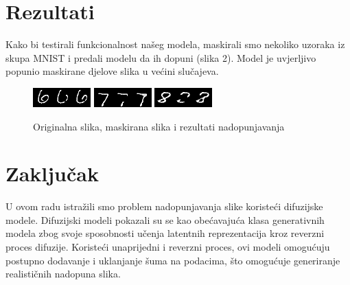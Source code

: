 \documentclass[10pt, a4paper, croatian]{article}
\begin{document}
\section{Rezultati}
Kako bi testirali funkcionalnost našeg modela, maskirali smo nekoliko uzoraka iz skupa MNIST i predali modelu da ih dopuni (slika 2).
Model je uvjerljivo popunio maskirane djelove slika u većini slučajeva.
\begin{figure}
	\begin{center}
	\includegraphics[width=\columnwidth]{../repaint_output/inpainted_combined_6.png}
	\includegraphics[width=\columnwidth]{../repaint_output/inpainted_combined_7.png}
	\includegraphics[width=\columnwidth]{../repaint_output/inpainted_combined_8.png}
	\caption{Originalna slika, maskirana slika i rezultati nadopunjavanja}
	\label{fig:figure3}
	\end{center}
\end{figure}

\section{Zaključak}

U ovom radu istražili smo problem nadopunjavanja slike koristeći difuzijske modele. Difuzijski modeli pokazali su se kao obećavajuća klasa generativnih modela zbog svoje sposobnosti učenja latentnih reprezentacija kroz reverzni proces difuzije. Koristeći unaprijedni i reverzni proces, ovi modeli omogućuju postupno dodavanje i uklanjanje šuma na podacima, što omogućuje generiranje realističnih nadopuna slika.
\end{document}
